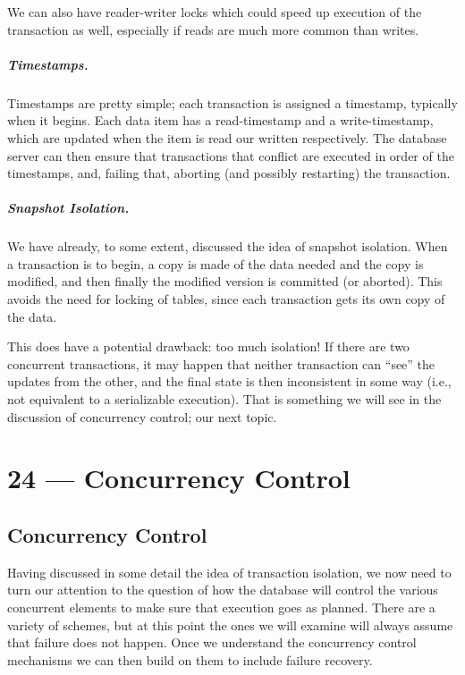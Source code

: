\documentclass[a4paper]{report}
\begin{document}
We can also have reader-writer locks which could speed up execution of the transaction as well, especially if reads are much more common than writes.


\paragraph{Timestamps.}  Timestamps are pretty simple; each transaction is assigned a timestamp, typically when it begins. Each data item has a read-timestamp and a write-timestamp, which are updated when the item is read our written respectively. The database server can then ensure that transactions that conflict are executed in order of the timestamps, and, failing that, aborting (and possibly restarting) the transaction.

\paragraph{Snapshot Isolation.} We have already, to some extent, discussed the idea of snapshot isolation. When a transaction is to begin, a copy is made of the data needed and the copy is modified, and then finally the modified version is committed (or aborted). This avoids the need for locking of tables, since each transaction gets its own copy of the data.

This does have a potential drawback: too much isolation! If there are two concurrent transactions, it may happen that neither transaction can ``see'' the updates from the other, and the final state is then inconsistent in some way (i.e., not equivalent to a serializable execution). That is something we will see in the discussion of concurrency control; our next topic.










\chapter*{24 --- Concurrency Control}


\section*{Concurrency Control}

Having discussed in some detail the idea of transaction isolation, we now need to turn our attention to the question of how the database will control the various concurrent elements to make sure that execution goes as planned. There are a variety of schemes, but at this point the ones we will examine will always assume that failure does not happen. Once we understand the concurrency control mechanisms we can then build on them to include failure recovery.
\end{document}
